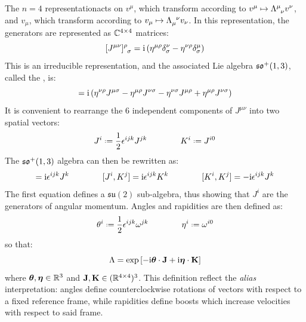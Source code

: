 The $ n = 4 $ representation\footnotemark acts on  $ v^\mu $, which transform according to $ v^\mu \mapsto \tensor{\Lambda}{^\mu_\nu} v^\nu $, and  $ v_\mu $, which transform according to $ v_\mu \mapsto \tensor{\Lambda}{_\mu^\nu} v_\nu $. In this representation, the generators are represented as $ \mathbb{C}^{4 \times 4} $ matrices:
\begin{equation}
  \tensor{[J^{\mu \nu}]}{^\rho_\sigma} = \img \left( \eta^{\mu \rho} \delta^\nu_\sigma - \eta^{\nu \rho} \delta^\mu_\sigma \right)
  \label{eq:lor-gen}
\end{equation}
This is an irreducible representation, and the associated Lie algebra $ \mathfrak{so}^+(1,3) $, called the , is:
\begin{equation}
  [J^{\mu \nu}, J^{\sigma \rho}] = \img \left( \eta^{\nu \rho} J^{\mu \sigma} - \eta^{\mu \rho} J^{\nu \sigma} - \eta^{\nu \sigma} J^{\mu \rho} + \eta^{\mu \rho} J^{\nu \sigma} \right)
  \label{eq:lor-comm}
\end{equation}
It is convenient to rearrange the 6 independent components of $ J^{\mu \nu} $ into two spatial vectors:
\begin{equation}
  J^i \defeq \frac{1}{2} \epsilon^{ijk} J^{jk}
  \qquad \qquad
  K^i \defeq J^{i0}
  \label{eq:lor-better-gen}
\end{equation}
The $ \mathfrak{so}^+(1,3) $ algebra can then be rewritten as:
\begin{equation}
  [J^i, J^j] = \img \epsilon^{ijk} J^k
  \qquad \qquad
  [J^i, K^j] = \img \epsilon^{ijk} K^k
  \qquad \qquad
  [K^i, K^j] = - \img \epsilon^{ijk} J^k
\end{equation}
The first equation defines a $ \mathfrak{su}(2) $ sub-algebra, thus showing that $ J^i $ are the generators of angular momentum. Angles and rapidities are then defined as:
\begin{equation}
  \theta^i \defeq \frac{1}{2} \epsilon^{ijk} \omega^{jk}
  \qquad \qquad
  \eta^i \defeq \omega^{i0}
\end{equation}
so that:
\begin{equation}
  \Lambda = \exp \left[ -\mathrm{i} \boldsymbol{\theta} \cdot \mathbf{J} + \mathrm{i} \boldsymbol{\eta} \cdot \mathbf{K} \right]
  \label{eq:lor-better-transf}
\end{equation}
where $ \boldsymbol{\theta} , \boldsymbol{\eta} \in \mathbb{R}^3 $ and $ \mathbf{J} , \mathbf{K} \in (\mathbb{R}^{4 \times 4})^3 $. This definition reflect the \textit{alias} interpretation: angles define counterclockwise rotations of vectors with respect to a fixed reference frame, while rapidities define boosts which increase velocities with respect to said frame.

